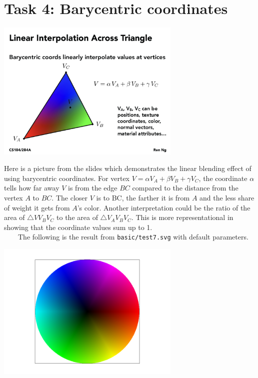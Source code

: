 \documentclass[11pt]{article}
\begin{document}
\newpage
\section{Task 4: Barycentric coordinates}

{\centering\includegraphics[width=250pt]{屏幕截图 2024-02-17 002417.png}\par}

Here is a picture from the slides which demonstrates the linear blending effect of using barycentric coordinates. For vertex $V=\alpha V_A+\beta V_B+\gamma V_C$, the coordinate $\alpha$ tells how far away $V$ is from the edge $BC$ compared to the distance from the vertex $A$ to $BC$. The closer $V$ is to BC, the farther it is from $A$ and the less share of weight it gets from $A$'s color. Another interpretation could be the ratio of the area of $\triangle{VV_BV_C}$ to the area of $\triangle{V_AV_BV_C}$. This is more representational in showing that the coordinate values sum up to 1.\\\mbox{\ \ \ \ }The following is the result from \verb|basic/test7.svg| with default parameters.

{\centering\includegraphics[width=250pt]{screenshot_2-16_0-31-23.png}\par}
\end{document}
